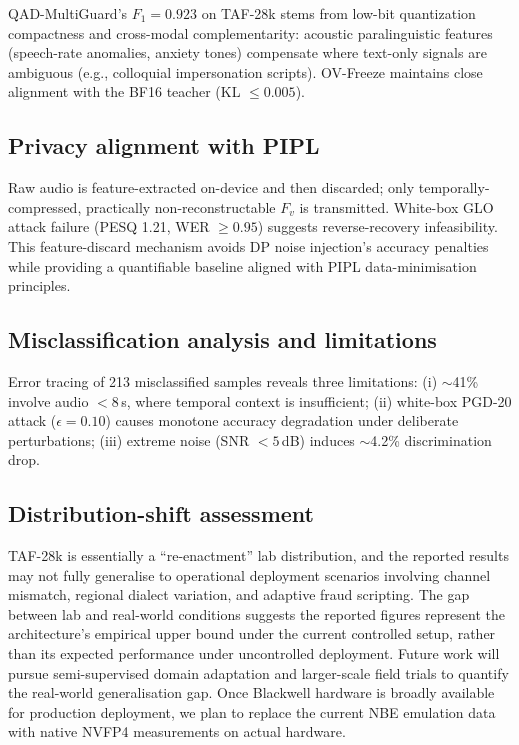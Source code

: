 \documentclass[11pt, a4paper]{article}
\begin{document}
QAD-MultiGuard's $F_1 = 0.923$ on TAF-28k stems from low-bit quantization compactness and cross-modal complementarity: acoustic paralinguistic features (speech-rate anomalies, anxiety tones) compensate where text-only signals are ambiguous (e.g., colloquial impersonation scripts). OV-Freeze maintains close alignment with the BF16 teacher (KL $\le 0.005$).

\subsection{Privacy alignment with PIPL}

Raw audio is feature-extracted on-device and then discarded; only temporally-compressed, practically non-reconstructable $F_v$ is transmitted. White-box GLO attack failure (PESQ 1.21, WER $\ge 0.95$) suggests reverse-recovery infeasibility. This feature-discard mechanism avoids DP noise injection's accuracy penalties while providing a quantifiable baseline aligned with PIPL data-minimisation principles.

\subsection{Misclassification analysis and limitations}

Error tracing of 213 misclassified samples reveals three limitations: (i) $\sim$41\% involve audio $<8$\,s, where temporal context is insufficient; (ii) white-box PGD-20 attack ($\epsilon = 0.10$) causes monotone accuracy degradation under deliberate perturbations; (iii) extreme noise (SNR $<5$\,dB) induces $\sim$4.2\% discrimination drop.

\subsection{Distribution-shift assessment}

TAF-28k is essentially a ``re-enactment'' lab distribution, and the reported results may not fully generalise to operational deployment scenarios involving channel mismatch, regional dialect variation, and adaptive fraud scripting. The gap between lab and real-world conditions suggests the reported figures represent the architecture's empirical upper bound under the current controlled setup, rather than its expected performance under uncontrolled deployment. Future work will pursue semi-supervised domain adaptation and larger-scale field trials to quantify the real-world generalisation gap. Once Blackwell hardware is broadly available for production deployment, we plan to replace the current NBE emulation data with native NVFP4 measurements on actual hardware.
\end{document}
